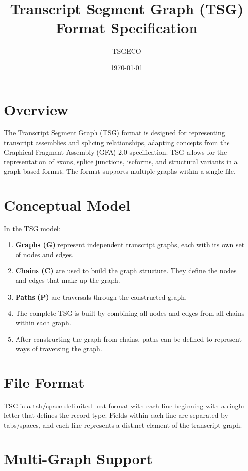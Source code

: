 \documentclass{article}
\title{Transcript Segment Graph (TSG) Format Specification}
\author{TSGECO}
\date{\today}
\begin{document}
\maketitle

\section{Overview}

The Transcript Segment Graph (TSG) format is designed for representing transcript assemblies and splicing relationships, adapting concepts from the Graphical Fragment Assembly (GFA) 2.0 specification.
TSG allows for the representation of exons, splice junctions, isoforms, and structural variants in a graph-based format. The format supports multiple graphs within a single file.

\section{Conceptual Model}

In the TSG model:

\begin{enumerate}
	\item \textbf{Graphs (G)} represent independent transcript graphs, each with its own set of nodes and edges.
	\item \textbf{Chains (C)} are used to build the graph structure. They define the nodes and edges that make up the graph.
	\item \textbf{Paths (P)} are traversals through the constructed graph.
	\item The complete TSG is built by combining all nodes and edges from all chains within each graph.
	\item After constructing the graph from chains, paths can be defined to represent ways of traversing the graph.
\end{enumerate}

\section{File Format}

TSG is a tab/space-delimited text format with each line beginning with a single letter that defines the record type.
Fields within each line are separated by tabs/spaces, and each line represents a distinct element of the transcript graph.

\section{Multi-Graph Support}
\end{document}
